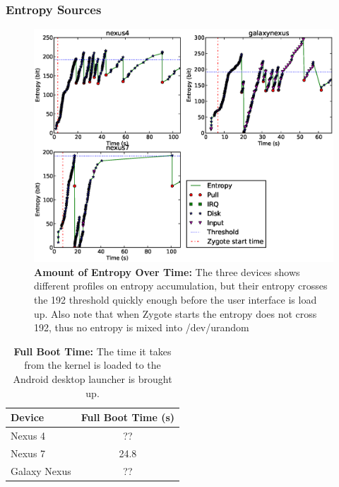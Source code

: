 \subsubsection{Entropy Sources}
\begin{figure}[t]
\begin{center}
\includegraphics[scale=0.6]{entropy.eps}
\end{center}
\caption{{\bf Amount of Entropy Over Time:} The three devices shows different profiles on entropy accumulation, but their entropy crosses the 192 threshold quickly enough before the user interface is load up. Also note that when Zygote starts the entropy does not cross 192, thus no entropy is mixed into /dev/urandom   }
\label{figentropy}
\end{figure}

\begin{table}
\begin{center}
\begin{tabular}{|l|c|}
\hline
\bf Device & \bf Full Boot Time (s) \\
\hline
Nexus 4 & ?? \\
\hline
Nexus 7 & 24.8 \\
\hline
Galaxy Nexus & ??\\
\hline

\end{tabular}
\end{center}
\caption{{\bf Full Boot Time:} The time it takes from the kernel is loaded to the Android desktop launcher is brought up.}
\label{tblboottime}
\end{table}

